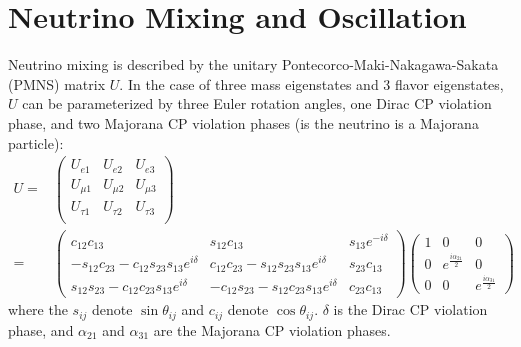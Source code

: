 \documentclass[herrin-thesis.tex]{subfiles}
\begin{document}
\section{Neutrino Mixing and Oscillation}
Neutrino mixing is described by the unitary Pontecorco-Maki-Nakagawa-Sakata (PMNS) matrix \(U\). In the case of three mass eigenstates and 3 flavor eigenstates, \(U\) can be parameterized by three Euler rotation angles, one Dirac CP violation phase, and two Majorana CP violation phases (is the neutrino is a Majorana particle):
\begin{align}
U =&\begin{pmatrix}
	U_{e1}	&	U_{e2}	& 	U_{e3}	\\
	U_{\mu1}	&	U_{\mu2}	& 	U_{\mu3}	\\
	U_{\tau1}	&	U_{\tau2}	& 	U_{\tau3}	\\
	\end{pmatrix}\\
	=&\begin{pmatrix}
	c_{12}c_{13}							&	s_{12}c_{13}							&	s_{13}e^{-i\delta}	\\
	-s_{12}c_{23}-c_{12}s_{23}s_{13}e^{i\delta}	&	c_{12}c_{23}-s_{12}s_{23}s_{13}e^{i\delta}	&	s_{23}c_{13}		\\
	s_{12}s_{23}-c_{12}c_{23}s_{13}e^{i\delta}	&	-c_{12}s_{23}-s_{12}c_{23}s_{13}e^{i\delta}	&	c_{23}c_{13}
	\end{pmatrix}
	\begin{pmatrix}
	1	&	0					&	0	\\
	0	&	e^{\frac{i\alpha_{21}}{2}}	&	0	\\
	0	&	0					&	e^{\frac{i\alpha_{31}}{2}}
	\end{pmatrix}\nonumber
\label{eq:nu_pmns_matrix}
\end{align}
where the \(s_{ij}\) denote \(\sin\theta_{ij}\) and \(c_{ij}\) denote \(\cos\theta_{ij}\). \(\delta\) is the Dirac CP violation phase, and \(\alpha_{21}\) and \(\alpha_{31}\) are the Majorana CP violation phases.
\end{document}
